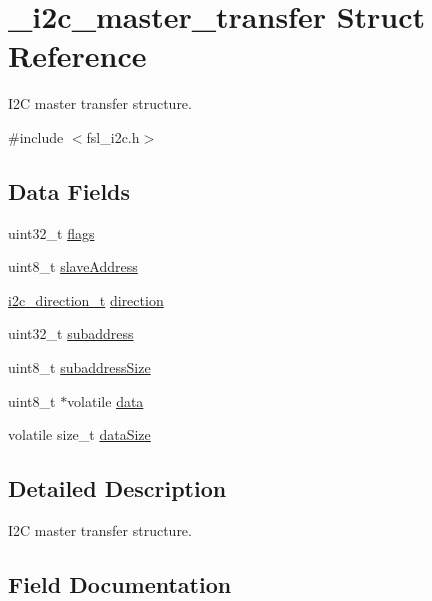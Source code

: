 \hypertarget{struct__i2c__master__transfer}{}\section{\+\_\+i2c\+\_\+master\+\_\+transfer Struct Reference}
\label{struct__i2c__master__transfer}


I2C master transfer structure.  




{\ttfamily \#include $<$fsl\+\_\+i2c.\+h$>$}

\subsection*{Data Fields}
\begin{DoxyCompactItemize}
\item 
uint32\+\_\+t \mbox{\hyperlink{struct__i2c__master__transfer_a773b39d480759f67926cb18ae2219281}{flags}}
\item 
uint8\+\_\+t \mbox{\hyperlink{struct__i2c__master__transfer_a7b9ab02d5063e8653f0586395ccd7013}{slave\+Address}}
\item 
\mbox{\hyperlink{group__i2c__driver_ga4bf954d998f086594eece268c780bec7}{i2c\+\_\+direction\+\_\+t}} \mbox{\hyperlink{struct__i2c__master__transfer_aec93fd70f8f4f4cf2fafcbe0a4df08c2}{direction}}
\item 
uint32\+\_\+t \mbox{\hyperlink{struct__i2c__master__transfer_a6fbfb5e5018422a177a9f3ed7269b127}{subaddress}}
\item 
uint8\+\_\+t \mbox{\hyperlink{struct__i2c__master__transfer_ab690ec66e8cde484f919799fb1118cd6}{subaddress\+Size}}
\item 
uint8\+\_\+t $\ast$volatile \mbox{\hyperlink{struct__i2c__master__transfer_a6df23c71c49ca7371f41136934d4fad1}{data}}
\item 
volatile size\+\_\+t \mbox{\hyperlink{struct__i2c__master__transfer_aec81567ca73e5b0cb790098785e345c5}{data\+Size}}
\end{DoxyCompactItemize}


\subsection{Detailed Description}
I2C master transfer structure. 

\subsection{Field Documentation}
\mbox{\label{struct__i2c__master__transfer_a6df23c71c49ca7371f41136934d4fad1}} 
